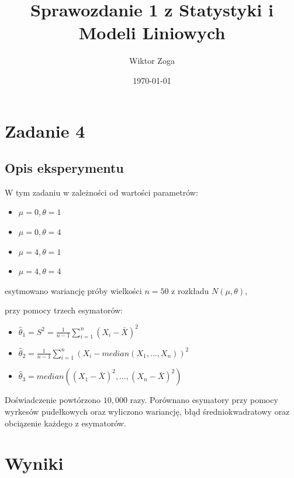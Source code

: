 \documentclass[a4paper,12pt]{article}
\title{Sprawozdanie 1 z Statystyki i Modeli Liniowych}
\author{Wiktor Zoga}
\date{\today}
\begin{document}
\maketitle
\newpage

\section{Zadanie 4}

\subsection{Opis eksperymentu}
W tym zadaniu w zależności od wartości parametrów: 

\begin{itemize}
    \item $\mu=0, \theta=1$
    \item $\mu=0, \theta=4$
    \item $\mu=4, \theta=1$
    \item $\mu=4, \theta=4$
\end{itemize}

esytmowano wariancję próby wielkości $n=50$ z rozkładu $N(\mu, \theta)$,

przy pomocy trzech esymatorów:

\begin{itemize}
    \item $\hat{\theta}_1 = S^{2} = \frac{1}{n-1}\sum_{i=1}^{n}(X_{i}-\bar{X})^{2}$
    \item $\hat{\theta}_2 = \frac{1}{n-1}\sum_{i=1}^{n}(X_{i} - median(X_{1}, \dots, X_{n}))^{2}$
    \item $\hat{\theta}_3 = median((X_1 - \bar{X})^{2}, \dots, (X_{n} -\bar{X})^2)$
\end{itemize}

Doświadczenie powtórzono $10{,}000$ razy. Porównano esymatory przy pomocy wyrkesów pudełkowych oraz
wyliczono wariancję, błąd średniokwadratowy oraz obciązenie każdego z esymatorów. 

\section{Wyniki}
\end{document}
